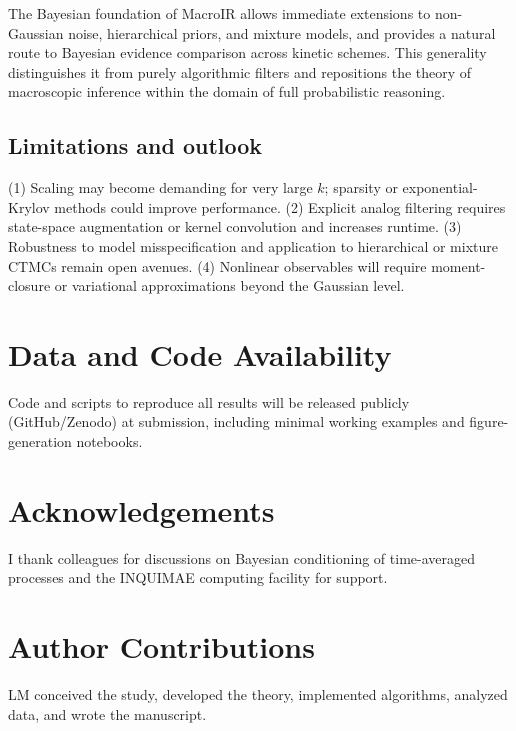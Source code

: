 \documentclass[9pt]{elife}
\begin{document}
	The Bayesian foundation of MacroIR allows immediate extensions to non-Gaussian noise, hierarchical priors, and mixture models, and provides a natural route to Bayesian evidence comparison across kinetic schemes. 
	This generality distinguishes it from purely algorithmic filters and repositions the theory of macroscopic inference within the domain of full probabilistic reasoning.
	
	\subsection*{Limitations and outlook}
	(1) Scaling may become demanding for very large $k$; sparsity or exponential-Krylov methods could improve performance. 
	(2) Explicit analog filtering requires state-space augmentation or kernel convolution and increases runtime. 
	(3) Robustness to model misspecification and application to hierarchical or mixture CTMCs remain open avenues. 
	(4) Nonlinear observables will require moment-closure or variational approximations beyond the Gaussian level.
	
	\section*{Data and Code Availability}
	Code and scripts to reproduce all results will be released publicly (GitHub/Zenodo) at submission, including minimal working examples and figure-generation notebooks.
	
	\section*{Acknowledgements}
	I thank colleagues for discussions on Bayesian conditioning of time-averaged processes and the INQUIMAE computing facility for support.
	
	\section*{Author Contributions}
	LM conceived the study, developed the theory, implemented algorithms, analyzed data, and wrote the manuscript.
	
	
	
\end{document}
